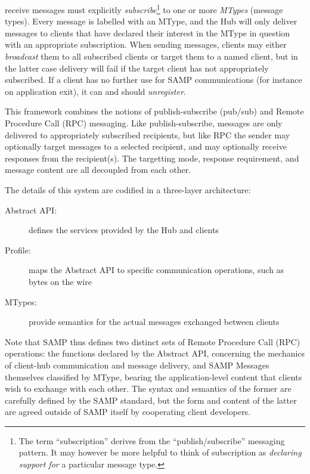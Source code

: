 \documentclass[5p]{elsarticle}
\begin{document}
receive messages must explicitly {\em subscribe}\footnote{
   The term ``subscription'' derives from the ``publish/subscribe''
   messaging pattern.  It may however be more helpful to think of
   subscription as {\em declaring support for\/} a particular message type.
}
to one or more {\em MTypes} (message types).
Every message is labelled with an MType,
and the Hub will only deliver messages to clients
that have declared their interest in the MType in question with
an appropriate subscription.  When sending messages, clients may
either {\em broadcast\/} them to all subscribed clients or
target them to a named client, but in the latter case delivery
will fail if the target client has not appropriately subscribed.
If a client has no further use for SAMP communications
(for instance on application exit), it can and should {\em unregister\/}.

This framework combines the notions of publish-subscribe
(pub/sub) and Remote Procedure Call (RPC) messaging.
Like publish-subscribe, messages are only delivered to
appropriately subscribed recipients,
but like RPC the sender may optionally
target messages to a selected recipient,
and may optionally receive responses from the recipient(s).
The targetting mode, response requirement, and message content
are all decoupled from each other.

The details of this system are codified in a three-layer architecture:
\begin{description}
\item[Abstract API:] defines the services provided by the Hub and clients
\item[Profile:] maps the Abstract API to specific communication operations,
  such as bytes on the wire
\item[MTypes:] provide semantics for the actual messages exchanged between
  clients
\end{description}

Note that SAMP thus defines two distinct sets of
Remote Procedure Call (RPC) operations:
the functions declared by the Abstract API,
concerning the mechanics of client-hub communication and message delivery,
and SAMP Messages themselves classified by MType,
bearing the application-level content that clients wish
to exchange with each other.
The syntax and semantics of the former are carefully defined by the
SAMP standard, but the form and content of the latter are
agreed outside of SAMP itself by cooperating client developers.
\end{document}
